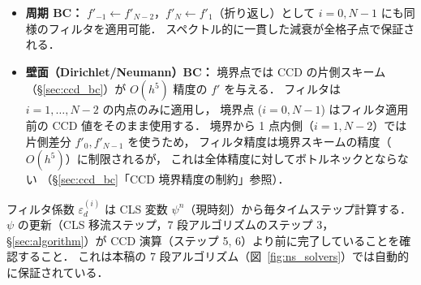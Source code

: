\begin{itemize}
  \item \textbf{周期 BC：}
        $f'_{-1} \leftarrow f'_{N-2}$，$f'_{N} \leftarrow f'_{1}$（折り返し）として
        $i=0, N-1$ にも同様のフィルタを適用可能．
        スペクトル的に一貫した減衰が全格子点で保証される．
  \item \textbf{壁面（Dirichlet/Neumann）BC：}
        境界点では CCD の片側スキーム（§\ref{sec:ccd_bc}）が $O(h^5)$ 精度の $f'$ を与える．
        フィルタは $i=1, \ldots, N-2$ の内点のみに適用し，
        境界点 ($i=0, N-1$) はフィルタ適用前の CCD 値をそのまま使用する．
        境界から 1 点内側（$i=1, N-2$）では片側差分 $f'_0, f'_{N-1}$ を使うため，
        フィルタ精度は境界スキームの精度（$O(h^5)$）に制限されるが，
        これは全体精度に対してボトルネックとならない
        （§\ref{sec:ccd_bc}「CCD 境界精度の制約」参照）．
\end{itemize}

\begin{tcolorbox}[warnbox, title={Dissipative-CCD フィルタの適用範囲（実装上の注意）}]
フィルタ係数 $\varepsilon_d^{(i)}$ は CLS 変数 $\psi^n$（現時刻）から毎タイムステップ計算する．
$\psi$ の更新（CLS 移流ステップ，7 段アルゴリズムのステップ 3，§\ref{sec:algorithm}）が
CCD 演算（ステップ 5, 6）より前に完了していることを確認すること．
これは本稿の 7 段アルゴリズム（図~\ref{fig:ns_solvers}）では自動的に保証されている．
\end{tcolorbox}
